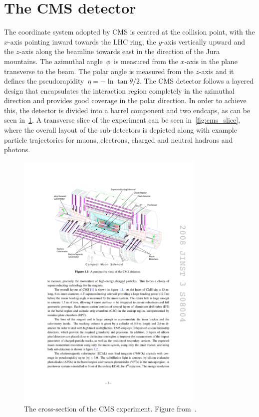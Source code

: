 \section{The CMS detector}
The coordinate system adopted by CMS is centred at the collision point, with the $x$-axis pointing inward towards the LHC ring, the $y$-axis vertically upward and the $z$-axis along the beamline towards east in the direction of the Jura mountains. The azimuthal angle~$\phi$~is measured from the $x$-axis in the plane transverse to the beam. The polar angle is measured from the $z$-axis and it defines the pseudorapidity~$\eta = -\ln{\tan{\theta/2}}$. The CMS detector follows a layered design that encapsulates the interaction region completely in the azimuthal direction and provides good coverage in the polar direction. In order to achieve this, the detector is divided into a barrel component and two endcaps, as can be seen in~\cref{fig:cms_experiment}. A transverse slice of the experiment can be seen in~\cref{fig:cms_slice}, where the overall layout of the sub-detectors is depicted along with example particle trajectories for muons, electrons, charged and neutral hadrons and photons. 

\begin{figure}
\begin{centering}
\includegraphics[width=0.8\textwidth]{figures/exp/cms.pdf}
\caption[The cross-section of the CMS experiment.]{The cross-section of the CMS experiment. Figure from~\cite{Chatrchyan:2008aa}.}
\label{fig:cms_experiment}
\end{centering}
\end{figure}

